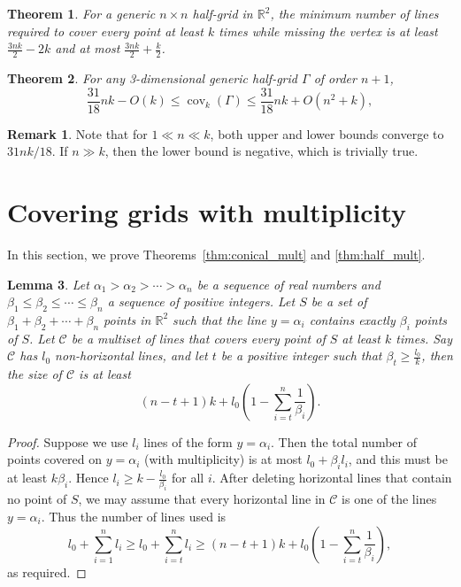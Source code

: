 \documentclass[usenames,dvipsnames, 11pt]{article}
\newtheorem{thm}{Theorem}
\newtheorem{lem}[thm]{Lemma}
\numberwithin{thm}{section}
\theoremstyle{definition}
\theoremstyle{definition}
\newtheorem{rem}{Remark}
\theoremstyle{definition}
\newcommand{\cov}[1]{\operatorname{cov}_{#1}}
\newcommand{\1}{\mathbf{1}}
\begin{document}
\begin{thm}
\label{thm:generic_dim2}
    For a generic $n \times n$ half-grid in $\mathbb{R}^2$, the minimum number of lines required to cover every point at least $k$ times while missing the vertex is at least
    $\frac{3nk}{2} - 2k$ and at most $\frac{3nk}{2} + \frac{k}{2}$.
\end{thm}




   \begin{thm}
   \label{thm:generic_dim3}
    For any 3-dimensional generic half-grid $\Gamma$ of order $n+1$, 
    \[
\frac{31}{18}nk-O(k)
\leq
\cov{k}(\Gamma)
\leq
\frac{31}{18}nk+O(n^2+k),
\]
\end{thm}


\begin{rem}
    Note that for $1 \ll n \ll k$, both upper and lower bounds converge to $31nk/18$.
    If $n \gg k$, then the lower bound is negative, which is trivially true.
\end{rem}

\section{Covering grids with multiplicity}
In this section, we prove Theorems~\ref{thm:conical_mult} and \ref{thm:half_mult}. 

\begin{lem}
    Let $\alpha_1>\alpha_2> \cdots >\alpha_n$ be a sequence of real numbers and $\beta_1 \leq \beta_2 \leq \cdots \leq \beta_n$ a sequence of positive integers. Let $S$ be a set of $\beta_1+\beta_2+\cdots +\beta_n$ points in $\mathbb{R}^2$ such that the line $y=\alpha_i$ contains exactly $\beta_i$ points of $S$. Let
    $\mathcal{C}$ be a multiset of lines that covers every point of $S$ at least $k$ times. Say $\mathcal{C}$ has $l_0$ non-horizontal lines, and let $t$ be a positive integer such that $\beta_t \geq \frac{l_0}{k}$, then the size of $\mathcal{C}$ is at least
    $$(n-t+1)k+l_0 \left(1-\sum_{i=t}^n \frac{1}{\beta_i} \right).$$
\end{lem}
\begin{proof}
    Suppose we use $l_i$ lines of the form $y=\alpha_i$. Then the total number of points covered on $y=\alpha_i$ (with multiplicity) is at most $l_0+\beta_il_i$, and this must be at least $k\beta_i$. Hence $l_i \geq k- \frac{l_0}{\beta_i}$ for all $i$. 
    After deleting horizontal lines that contain no point of $S$, we may assume
that every horizontal line in $\mathcal C$ is one of the lines
$y=\alpha_i$. Thus the number of lines used is
    $$l_0+\sum_{i=1}^n l_i \geq l_0 + \sum_{i = t}^n l_i \geq (n-t+1)k+l_0 \left(1-\sum_{i=t}^n \frac{1}{\beta_i} \right),$$
    as required.
\end{proof}
\end{document}

